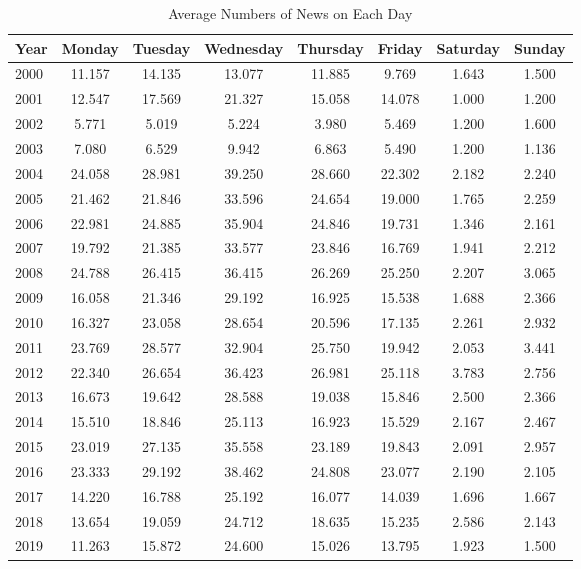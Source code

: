 \documentclass[12pt]{article}
\begin{document}
	\begin{table}[H]
		\centering
		\small
		\caption{Average Numbers of News on Each Day}
		\begin{tabular}{l|c c c c c c c}
			\toprule
			Year & Monday &Tuesday &Wednesday &Thursday &Friday &Saturday &Sunday \\ 
			\midrule
2000 & 11.157 & 14.135 & 13.077 & 11.885 & 9.769 & 1.643 & 1.500 \\
2001 & 12.547 & 17.569 & 21.327 & 15.058 & 14.078 & 1.000 & 1.200 \\
2002 & 5.771 & 5.019 & 5.224 & 3.980 & 5.469 & 1.200 & 1.600 \\
2003 & 7.080 & 6.529 & 9.942 & 6.863 & 5.490 & 1.200 & 1.136 \\
2004 & 24.058 & 28.981 & 39.250 & 28.660 & 22.302 & 2.182 & 2.240 \\
2005 & 21.462 & 21.846 & 33.596 & 24.654 & 19.000 & 1.765 & 2.259 \\
2006 & 22.981 & 24.885 & 35.904 & 24.846 & 19.731 & 1.346 & 2.161 \\
2007 & 19.792 & 21.385 & 33.577 & 23.846 & 16.769 & 1.941 & 2.212 \\
2008 & 24.788 & 26.415 & 36.415 & 26.269 & 25.250 & 2.207 & 3.065 \\
2009 & 16.058 & 21.346 & 29.192 & 16.925 & 15.538 & 1.688 & 2.366 \\
2010 & 16.327 & 23.058 & 28.654 & 20.596 & 17.135 & 2.261 & 2.932 \\
2011 & 23.769 & 28.577 & 32.904 & 25.750 & 19.942 & 2.053 & 3.441 \\
2012 & 22.340 & 26.654 & 36.423 & 26.981 & 25.118 & 3.783 & 2.756 \\
2013 & 16.673 & 19.642 & 28.588 & 19.038 & 15.846 & 2.500 & 2.366 \\
2014 & 15.510 & 18.846 & 25.113 & 16.923 & 15.529 & 2.167 & 2.467 \\
2015 & 23.019 & 27.135 & 35.558 & 23.189 & 19.843 & 2.091 & 2.957 \\
2016 & 23.333 & 29.192 & 38.462 & 24.808 & 23.077 & 2.190 & 2.105 \\
2017 & 14.220 & 16.788 & 25.192 & 16.077 & 14.039 & 1.696 & 1.667 \\
2018 & 13.654 & 19.059 & 24.712 & 18.635 & 15.235 & 2.586 & 2.143 \\
2019 & 11.263 & 15.872 & 24.600 & 15.026 & 13.795 & 1.923 & 1.500 \\
		\bottomrule
		\end{tabular}
	\end{table}
\end{document}
